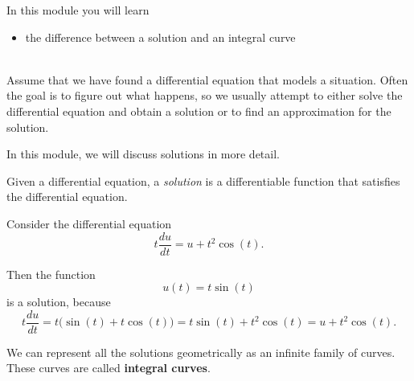 In this module you will learn
\begin{itemize}
	\item the difference between a solution and an integral curve
\end{itemize}

\hfill \\

Assume that we have found a differential equation that models a situation.
Often the goal is to figure out what happens, so we usually attempt to either solve the differential equation and obtain a solution or to find an approximation for the solution.

In this module, we will discuss solutions in more detail.

\begin{definition}[Solution]
	Given a differential equation, a \emph{solution} is a differentiable function that satisfies the differential equation.
\end{definition}

\begin{example}
Consider the differential equation
$$
t \frac{du}{dt} = u + t^2 \cos(t).
$$

Then the function 
$$
u(t) = t\sin(t)
$$
is a solution, because
$$
t \frac{du}{dt} = t \big( \sin(t) + t \cos(t) \big) = t \sin(t) + t^2 \cos (t) = u + t^2 \cos(t).
$$
\end{example}



\begin{definition}
	We can represent all the solutions geometrically as an infinite family of curves. These curves are called \textbf{integral curves}.
\end{definition}

